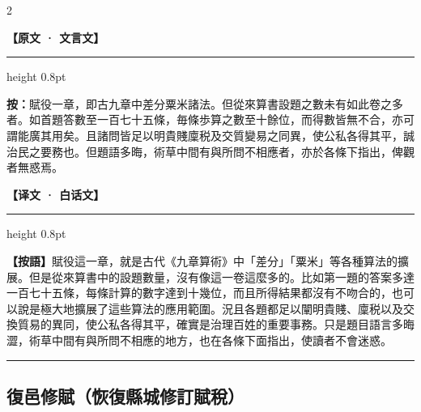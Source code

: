 \documentclass[11pt,a4paper]{article}
\newcommand{\longline}{\noindent\rule{\textwidth}{0.4pt}}
\newcommand{\ClassicalHeader}{%
  \begin{center}\textbf{\color{headerclassical}【原文 · 文言文】}\end{center}
  \vspace{-0.5em}
  \hrule height 0.8pt
  \vspace{0.5em}
}
\newcommand{\ModernHeader}{%
  \begin{center}\textbf{\color{headermodern}【译文 · 白话文】}\end{center}
  \vspace{-0.5em}
  \hrule height 0.8pt
  \vspace{0.5em}
}
\begin{document}
\begin{paracol}{2}

\ClassicalHeader

\noindent\textbf{按：}賦役一章，即古九章中差分粟米諸法。但從來算書設題之數未有如此卷之多者。如首題答數至一百七十五條，毎條歩算之數至十餘位，而得數皆無不合，亦可謂能廣其用矣。且諸問皆足以明貴賤廩税及交質變易之同異，使公私各得其平，誠治民之要務也。但題語多晦，術草中間有與所問不相應者，亦於各條下指出，俾觀者無惑焉。

\switchcolumn

\ModernHeader

\noindent\textbf{【按語】}賦役這一章，就是古代《九章算術》中「差分」「粟米」等各種算法的擴展。但是從來算書中的設題數量，沒有像這一卷這麼多的。比如第一題的答案多達一百七十五條，每條計算的數字達到十幾位，而且所得結果都沒有不吻合的，也可以說是極大地擴展了這些算法的應用範圍。況且各題都足以闡明貴賤、廩税以及交換質易的異同，使公私各得其平，確實是治理百姓的重要事務。只是題目語言多晦澀，術草中間有與所問不相應的地方，也在各條下面指出，使讀者不會迷惑。

\end{paracol}

\longline

\subsection*{\color{sectioncolor}復邑修賦（恢復縣城修訂賦稅）}
\end{document}
